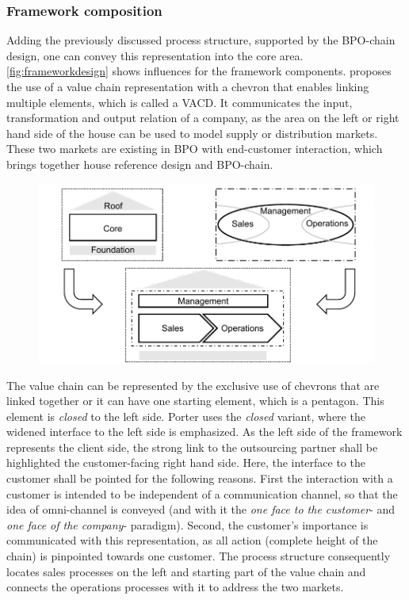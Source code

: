 	\subsubsection{Framework composition}
	
	Adding the previously discussed process structure, supported by the BPO-chain design, one can convey this representation into the core area. \Fig \ref{fig:frameworkdesign} shows influences for the framework components. 
	\citeauthor{Meise2001} proposes the use of a value chain representation with a chevron that enables linking  multiple elements, which is called a \acrfull{VACD}. It communicates the input, transformation and output relation of a company, as the area on the left or right hand side of the house can be used to model supply or distribution markets. 
	These two markets are existing in BPO with end-customer interaction, which brings together house reference design and \acrshort{BPO}-chain. 
	
	\begin{figure}[caption={Framework Design Influences}, label={fig:frameworkdesign}]
		{	\includegraphics[width=.8\textwidth]{figures/frameworkdesign.pdf}}
	\end{figure} 
	
	
	The value chain can be represented by the exclusive use of chevrons that are linked together or it can have one starting element, which is a pentagon. This element is \textit{closed} to the left side. Porter uses the \textit{closed} variant, where the widened interface to the left side is emphasized. As the left side of the framework represents the client side, the strong link to the outsourcing partner shall be highlighted \wrt the customer-facing right hand side. Here, the interface to the customer shall be pointed for the following reasons. First the interaction with a customer is intended to be independent of a communication channel, so that the idea of omni-channel is conveyed (and with it the \textit{one face to the customer}- and \textit{one face of the company}- paradigm). Second, the customer's importance is communicated with this representation, as all action (complete height of the chain) is pinpointed towards one customer. The  process structure consequently locates sales processes on the left and starting part of the value chain and connects the operations processes with it to address the two markets. 
	
